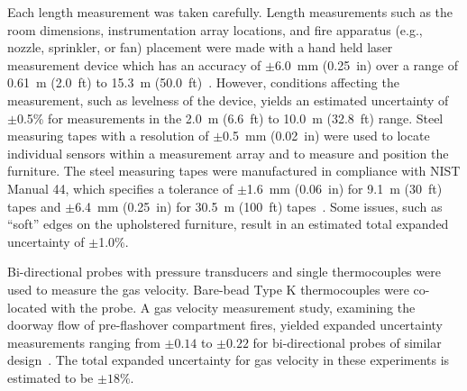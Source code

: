 \documentclass[12pt,oneside]{book}
\begin{document}
Each length measurement was taken carefully. Length measurements such as the room dimensions, instrumentation array locations, and fire apparatus (e.g., nozzle, sprinkler, or fan) placement were made with a hand held laser measurement device which has an accuracy of $\pm$6.0~mm (0.25~in) over a range of 0.61~m (2.0~ft) to 15.3~m (50.0~ft)~\cite{StanleyTools}.  However, conditions affecting the measurement, such as levelness of the device, yields an estimated uncertainty of $\pm$0.5\% for measurements in the 2.0~m (6.6~ft) to 10.0~m (32.8~ft) range. Steel measuring tapes with a resolution of $\pm$0.5~mm (0.02~in) were used to locate individual sensors within a measurement array and to measure and position the furniture. The steel measuring tapes were manufactured in compliance with NIST Manual 44, which specifies a tolerance of $\pm$1.6~mm (0.06~in) for 9.1~m (30~ft) tapes and $\pm$6.4~mm (0.25~in) for 30.5~m (100~ft) tapes~\cite{Butcher:2012}. Some issues, such as ``soft'' edges on the upholstered furniture, result in an estimated total expanded uncertainty of $\pm$1.0\%.

Bi-directional probes with pressure transducers and single thermocouples were used to measure the gas velocity. Bare-bead Type K thermocouples were co-located with the probe. A gas velocity measurement study, examining the doorway flow of pre-flashover compartment fires, yielded expanded uncertainty measurements ranging from $\pm0.14$ to $\pm0.22$ for bi-directional probes of similar design~\cite{Bryant:FSJ2009}. The total expanded uncertainty for gas velocity in these experiments is estimated to be $\pm18$\%.   
\end{document}
